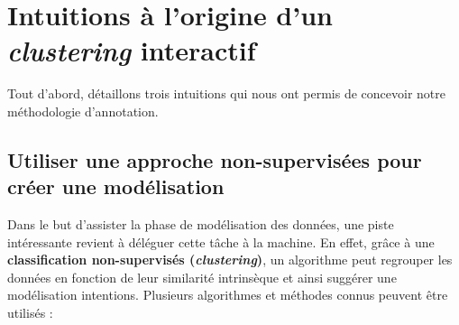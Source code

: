 \section{Intuitions à l'origine d'un \textit{clustering} interactif}
\label{section:3.1-INTUITIONS-ORIGINES}

	Tout d'abord, détaillons trois intuitions qui nous ont permis de concevoir notre méthodologie d'annotation.
	
	
	\subsection{Utiliser une approche non-supervisées pour créer une modélisation}
	\label{section:3.1.1-INTUITIONS-ORIGINES-NON-SUPERVISEES}
	
		Dans le but d'assister la phase de modélisation des données, une piste intéressante revient à déléguer cette tâche à la machine.
		En effet, grâce à une \textbf{classification non-supervisés (\textit{clustering})}, un algorithme peut regrouper les données en fonction de leur similarité intrinsèque et ainsi suggérer une modélisation intentions.
		Plusieurs algorithmes et méthodes connus peuvent être utilisés :
		
